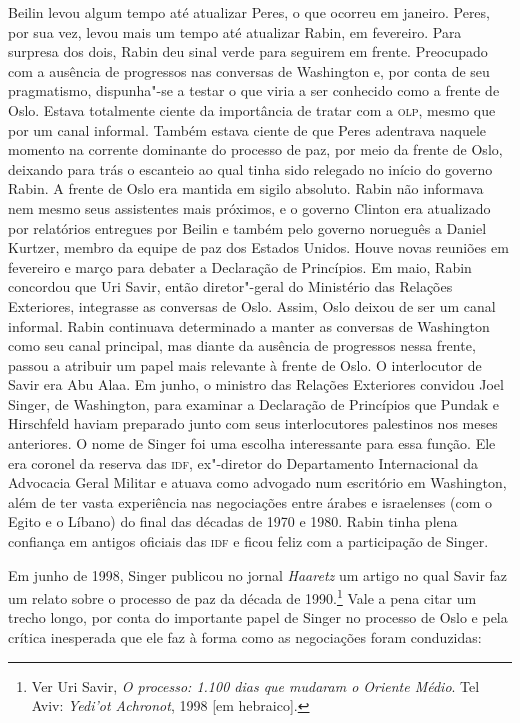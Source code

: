 Beilin levou algum tempo até atualizar Peres, o que ocorreu em janeiro.
Peres, por sua vez, levou mais um tempo até atualizar Rabin, em
fevereiro. Para surpresa dos dois, Rabin deu sinal verde para seguirem
em frente. Preocupado com a ausência de progressos nas conversas de
Washington e, por conta de seu pragmatismo, dispunha"-se a testar o que
viria a ser conhecido como a frente de Oslo. Estava totalmente ciente da
importância de tratar com a \textsc{olp}, mesmo que por um canal informal. Também
estava ciente de que Peres adentrava naquele momento na corrente
dominante do processo de paz, por meio da frente de Oslo, deixando para
trás o escanteio ao qual tinha sido relegado no início do governo Rabin.
A frente de Oslo era mantida em sigilo absoluto. Rabin não informava nem
mesmo seus assistentes mais próximos, e o governo Clinton era atualizado
por relatórios entregues por Beilin e também pelo governo norueguês a
Daniel Kurtzer, membro da equipe de paz dos Estados Unidos. Houve novas
reuniões em fevereiro e março para debater a Declaração de Princípios.
Em maio, Rabin concordou que Uri Savir, então diretor"-geral do
Ministério das Relações Exteriores, integrasse as conversas de Oslo.
Assim, Oslo deixou de ser um canal informal. Rabin continuava
determinado a manter as conversas de Washington como seu canal
principal, mas diante da ausência de progressos nessa frente, passou a
atribuir um papel mais relevante à frente de Oslo. O interlocutor de
Savir era Abu Alaa. Em junho, o ministro das Relações Exteriores
convidou Joel Singer, de Washington, para examinar a Declaração de
Princípios que Pundak e Hirschfeld haviam preparado junto com seus
interlocutores palestinos nos meses anteriores. O nome de Singer foi uma
escolha interessante para essa função. Ele era coronel da reserva das
\textsc{idf}, ex"-diretor do Departamento Internacional da Advocacia Geral Militar
e atuava como advogado num escritório em Washington, além
de ter vasta experiência nas negociações entre árabes e israelenses (com
o Egito e o Líbano) do final das décadas de 1970 e 1980. Rabin tinha
plena confiança em antigos oficiais das \textsc{idf} e ficou feliz com a
participação de Singer.

Em junho de 1998, Singer publicou no jornal \emph{Haaretz} um artigo no
qual Savir faz um relato sobre o processo de paz da década de
1990.\footnote{Ver Uri Savir, \emph{O processo: 1.100 dias que mudaram o Oriente Médio}.
Tel Aviv: \emph{Yedi'ot Achronot}, 1998 {[}em hebraico{]}.} Vale a pena
citar um trecho longo, por conta do importante papel de Singer no
processo de Oslo e pela crítica inesperada que ele faz à forma como as
negociações foram conduzidas:

